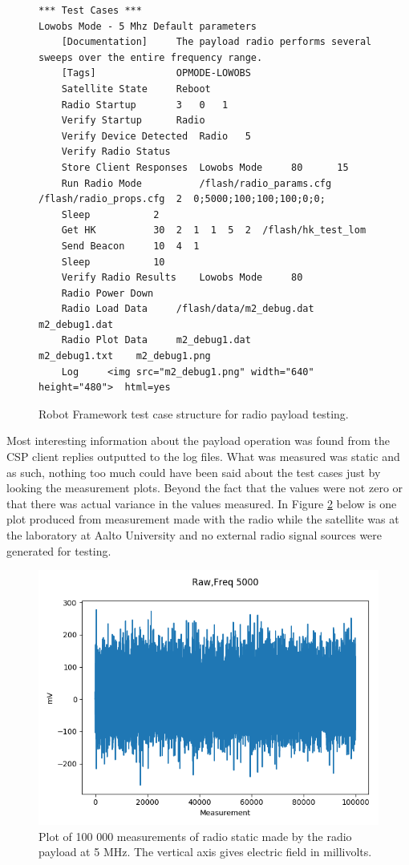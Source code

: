 \documentclass[english,12pt,a4paper,pdftex,elec,utf8]{aaltothesis}
\begin{document}
\begin{figure}[h!]
\centering
\begin{verbatim}
*** Test Cases ***
Lowobs Mode - 5 Mhz Default parameters
	[Documentation]		The payload radio performs several sweeps over the entire frequency range.
	[Tags]				OPMODE-LOWOBS
	Satellite State		Reboot
	Radio Startup		3	0	1
	Verify Startup		Radio
	Verify Device Detected	Radio 	5
	Verify Radio Status
	Store Client Responses	Lowobs Mode		80		15
	Run Radio Mode			/flash/radio_params.cfg  /flash/radio_props.cfg  2  0;5000;100;100;100;0;0;
	Sleep			2
	Get HK			30  2  1  1  5  2  /flash/hk_test_lom
	Send Beacon		10  4  1
	Sleep			10
	Verify Radio Results	Lowobs Mode		80
	Radio Power Down
	Radio Load Data 	/flash/data/m2_debug.dat 	m2_debug1.dat
	Radio Plot Data 	m2_debug1.dat 				m2_debug1.txt	 m2_debug1.png
	Log		<img src="m2_debug1.png" width="640" height="480">	html=yes
\end{verbatim}
\caption{Robot Framework test case structure for radio payload testing.}
\label{robotradio}
\end{figure}
Most interesting information about the payload operation was found from the CSP client replies outputted to the log files. What was measured was static and as such, nothing too much could have been said about the test cases just by looking the measurement plots. Beyond the fact that the values were not zero or that there was actual variance in the values measured. In Figure \ref{m1_debug1joo} below is one plot produced from measurement made with the radio while the satellite was at the laboratory at Aalto University and no external radio signal sources were generated for testing.\par 
\begin{figure}[h!]
\centering
\includegraphics[scale=0.6]{m1_debug1}
\caption{Plot of 100 000 measurements of radio static made by the radio payload at 5 MHz. The vertical axis gives electric field in millivolts.}
\label{m1_debug1joo}
\end{figure}
\end{document}

